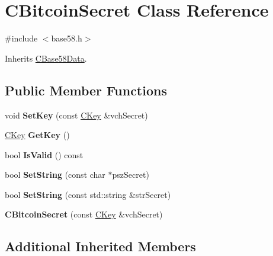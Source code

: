\hypertarget{class_c_bitcoin_secret}{}\section{C\+Bitcoin\+Secret Class Reference}
\label{class_c_bitcoin_secret}


{\ttfamily \#include $<$base58.\+h$>$}



Inherits \mbox{\hyperlink{class_c_base58_data}{C\+Base58\+Data}}.

\subsection*{Public Member Functions}
\begin{DoxyCompactItemize}
\item 
\mbox{\label{class_c_bitcoin_secret_a3629c0fce320664c3c07cb082939d6ec}} 
void {\bfseries Set\+Key} (const \mbox{\hyperlink{class_c_key}{C\+Key}} \&vch\+Secret)
\item 
\mbox{\label{class_c_bitcoin_secret_a4d6bf559d092e6d47f8001c7171096df}} 
\mbox{\hyperlink{class_c_key}{C\+Key}} {\bfseries Get\+Key} ()
\item 
\mbox{\label{class_c_bitcoin_secret_a2a93fa8a09826ff63498cb3e4370c154}} 
bool {\bfseries Is\+Valid} () const
\item 
\mbox{\label{class_c_bitcoin_secret_a6a8aff02f66099f33f573ad3e6375bb1}} 
bool {\bfseries Set\+String} (const char $\ast$psz\+Secret)
\item 
\mbox{\label{class_c_bitcoin_secret_a83cfc3b34aac494efdd6e316cd08626d}} 
bool {\bfseries Set\+String} (const std\+::string \&str\+Secret)
\item 
\mbox{\label{class_c_bitcoin_secret_a0358baa459a1f22661b601d9d83eacf8}} 
{\bfseries C\+Bitcoin\+Secret} (const \mbox{\hyperlink{class_c_key}{C\+Key}} \&vch\+Secret)
\end{DoxyCompactItemize}
\subsection*{Additional Inherited Members}


